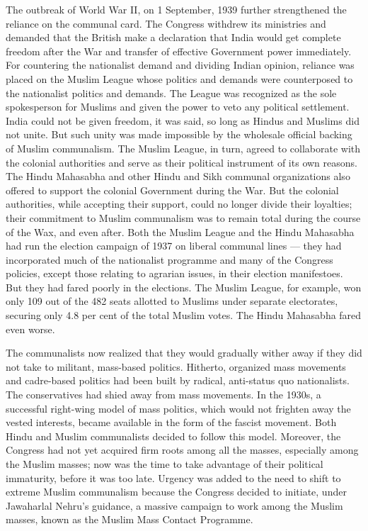 The outbreak of World War II, on 1 September, 1939 further strengthened the reliance on the communal card. The Congress withdrew its ministries and demanded that the British make a declaration that India would get complete freedom after the War and transfer of effective Government power immediately. For countering the nationalist demand and dividing Indian opinion, reliance was placed on the Muslim League whose politics and demands were counterposed to the nationalist politics and demands. The League was recognized as the sole spokesperson for Muslims and given the power to veto any political settlement. India could not be given freedom, it was said, so long as Hindus and Muslims did not unite. But such unity was made impossible by the wholesale official backing of Muslim communalism. The Muslim League, in turn, agreed to collaborate with the colonial authorities and serve as their political instrument of its own reasons. The Hindu Mahasabha and other Hindu and Sikh communal organizations also offered to support the colonial Government during the War. But the colonial authorities, while accepting their support, could no longer divide their loyalties; their commitment to Muslim communalism was to remain total during the course of the Wax, and even after. Both the Muslim League and the Hindu Mahasabha had run the election campaign of 1937 on liberal communal lines — they had incorporated much of the nationalist programme and many of the Congress policies, except those relating to agrarian issues, in their election manifestoes. But they had fared poorly in the elections. The Muslim League, for example, won only 109 out of the 482 seats allotted to Muslims under separate electorates, securing only 4.8 per cent of the total Muslim votes. The Hindu Mahasabha fared even worse. 

The communalists now realized that they would gradually wither away if they did not take to militant, mass-based politics. Hitherto, organized mass movements and cadre-based politics had been built by radical, anti-status quo nationalists. The conservatives had shied away from mass movements. In the 1930s, a successful right-wing model of mass politics, which would not frighten away the vested interests, became available in the form of the fascist movement. Both Hindu and Muslim communalists decided to follow this model. Moreover, the Congress had not yet acquired firm roots among all the masses, especially among the Muslim masses; now was the time to take advantage of their political immaturity, before it was too late. Urgency was added to the need to shift to extreme Muslim communalism because the Congress decided to initiate, under Jawaharlal Nehru's guidance, a massive campaign to work among the Muslim masses, known as the Muslim Mass Contact Programme. 

